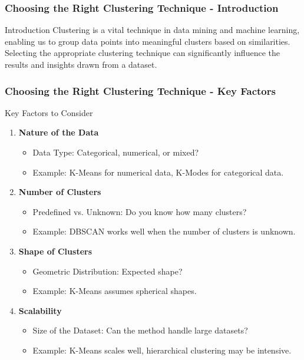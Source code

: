 \documentclass[aspectratio=169]{beamer}
\begin{document}
\begin{frame}[fragile]
    \frametitle{Choosing the Right Clustering Technique - Introduction}
    \begin{block}{Introduction}
        Clustering is a vital technique in data mining and machine learning, enabling us to group data points into meaningful clusters based on similarities. Selecting the appropriate clustering technique can significantly influence the results and insights drawn from a dataset.
    \end{block}
\end{frame}

\begin{frame}[fragile]
    \frametitle{Choosing the Right Clustering Technique - Key Factors}
    \begin{block}{Key Factors to Consider}
        \begin{enumerate}
            \item \textbf{Nature of the Data}
                \begin{itemize}
                    \item Data Type: Categorical, numerical, or mixed?
                    \item Example: K-Means for numerical data, K-Modes for categorical data.
                \end{itemize}

            \item \textbf{Number of Clusters}
                \begin{itemize}
                    \item Predefined vs. Unknown: Do you know how many clusters?
                    \item Example: DBSCAN works well when the number of clusters is unknown.
                \end{itemize}
                
            \item \textbf{Shape of Clusters}
                \begin{itemize}
                    \item Geometric Distribution: Expected shape?
                    \item Example: K-Means assumes spherical shapes.
                \end{itemize}
                
            \item \textbf{Scalability}
                \begin{itemize}
                    \item Size of the Dataset: Can the method handle large datasets?
                    \item Example: K-Means scales well, hierarchical clustering may be intensive.
                \end{itemize}
                

\end{enumerate}
\end{block}
\end{frame}
\end{document}
